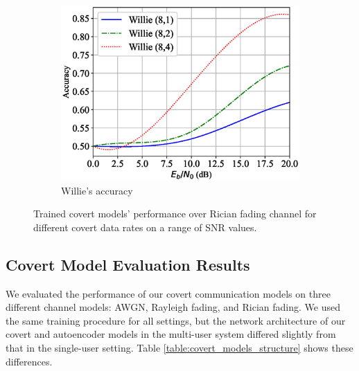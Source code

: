 \begin{figure}[tp!]
\begin{subfigure}{0.28\textwidth}
		\includegraphics[width=\linewidth]{figs/willie_accuracy_rician}
		\caption{Willie's accuracy}
		\label{fig:rician_resutls_willie}
	\end{subfigure}
	\caption{Trained covert models' performance over Rician fading channel for different covert data rates on a range of SNR values.}
	\label{fig:rician_resutls}
\end{figure}

\subsection{Covert Model Evaluation Results}
We evaluated the performance of our covert communication models on three different channel models: AWGN, Rayleigh fading, and Rician fading. We used the same training procedure for all settings, but the network architecture of our covert and autoencoder models in the multi-user system differed slightly from that in the single-user setting. Table \ref{table:covert_models_structure} shows these differences.

